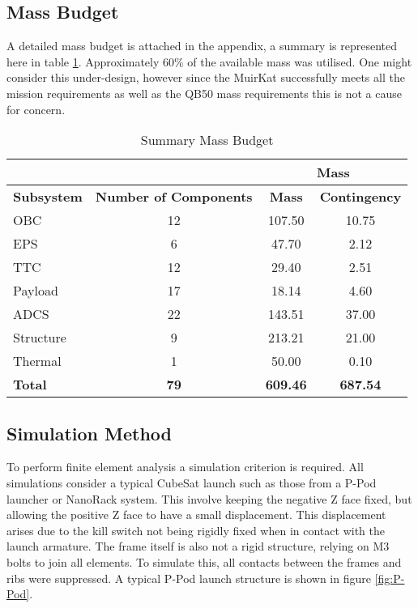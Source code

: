 \subsection{Mass Budget}
A detailed mass budget is attached in the appendix, a summary is represented here in table \ref{StrucBudget}. Approximately 60\% of the available mass was utilised. One might consider this under-design, however since the MuirKat successfully meets all the mission requirements as well as the QB50 mass requirements this is not a cause for concern. 
\begin{table}[!h]
\centering
\begin{tabular}{@{}lccc@{}}
\toprule
\textbf{}          & \textbf{}                     & \multicolumn{2}{c}{\textbf{Mass}}      \\ \midrule
\textbf{Subsystem} & \textbf{Number of Components} & \textbf{Mass}   & \textbf{Contingency} \\
OBC                & 12                            & 107.50          & 10.75                \\
EPS                & 6                             & 47.70           & 2.12                 \\
TTC                & 12                            & 29.40           & 2.51                 \\
Payload            & 17                            & 18.14           & 4.60                 \\
ADCS               & 22                            & 143.51          & 37.00                \\
Structure          & 9                             & 213.21          & 21.00                \\
Thermal            & 1                             & 50.00           & 0.10                 \\
\textbf{Total}     & \textbf{79}                   & \textbf{609.46} & \textbf{687.54}      \\ \bottomrule
\end{tabular}
\caption{Summary Mass Budget}
\label{StrucBudget}
\end{table}

\subsection{Simulation Method}
To perform finite element analysis a simulation criterion is required. All simulations consider a typical CubeSat launch such as those from a P-Pod launcher or NanoRack system. This involve keeping the negative Z face fixed, but allowing the positive Z face to have a small displacement. This displacement arises due to the kill switch not being rigidly fixed when in contact with the launch armature. The frame itself is also not a rigid structure, relying on M3 bolts to join all elements. To simulate this, all contacts between the frames and ribs were suppressed. A typical P-Pod launch structure is shown in figure \ref{fig:P-Pod}. 
  
